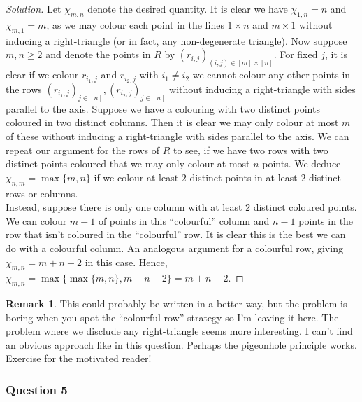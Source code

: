 \documentclass[11pt]{article}
\theoremstyle{definition}
\newtheorem*{remark}{Remark}
\begin{document}
\begin{proof}[Solution]
  Let $\chi_{m, n}$ denote the desired quantity. It is clear we have $\chi_{1, n} = n$ and $\chi_{m, 1} = m$, as 
  we may colour each point in the lines $1 \times n$ and $m \times 1$ without inducing a right-triangle (or in fact, 
  any non-degenerate triangle). Now suppose $m, n \geq 2$ and denote the points in $R$ by 
  $(r_{i, j})_{(i, j) \in [m] \times [n]}$. For fixed $j$, it is clear if we colour $r_{i_1, j}$ and $r_{i_2, j}$ 
  with $i_1 \neq i_2$ we cannot colour any other points in the rows $(r_{i_1, j})_{j \in [n]}, (r_{i_2, j})_{j \in [n]}$ 
  without inducing a right-triangle with sides parallel to the axis. Suppose we have a colouring with two distinct 
  points coloured in two distinct columns. Then it is clear we may only colour at most $m$ of these without inducing 
  a right-triangle with sides parallel to the axis. We can repeat our argument for the rows of $R$ to see, if we have 
  two rows with two distinct points coloured that we may only colour at most $n$ points. We deduce $\chi_{n, m} = 
  \max\{m, n\}$ if we colour at least $2$ distinct points in at least $2$ distinct rows or columns. \\ 

  Instead, suppose there is only one column with at least $2$ distinct coloured points. We can colour $m-1$ of points in 
  this ``colourful'' column and $n-1$ points in the row that isn't coloured in the ``colourful'' row. It is clear 
  this is the best we can do with a colourful column. An analogous argument for a colourful row, giving 
  $\chi_{m, n} = m + n - 2$ in this case. Hence, $\chi_{m, n} = \max\{\max\{m, n\}, m + n - 2\} = m + n -2$. 
\end{proof}

\begin{remark}
  This could probably be written in a better way, but the problem is boring when you spot the ``colourful row'' strategy 
  so I'm leaving it here. The problem where we disclude any right-triangle seems more interesting. I can't find an 
  obvious approach like in this question. Perhaps the pigeonhole principle works. Exercise for the motivated reader!
\end{remark}

\newpage

\subsubsection{Question 5}
\end{document}
